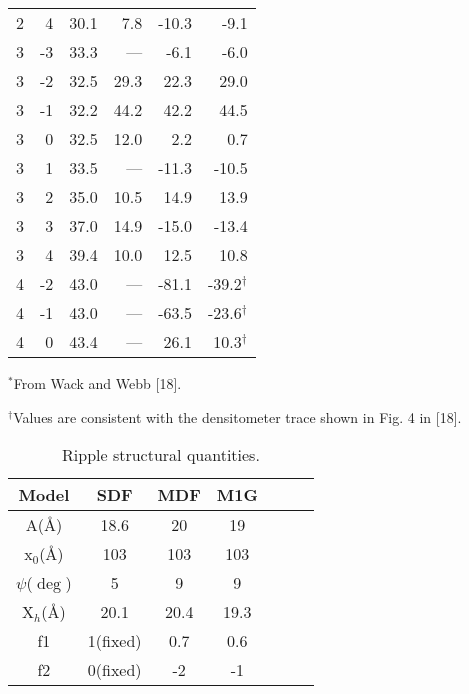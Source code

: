 \begin{table}
{\begin{tabular}{rrrrrr}
2 &   4 & 30.1  &  7.8  &  -10.3  &  -9.1 \\
3 &  -3 & 33.3  &  ---  &  -6.1  &  -6.0 \\
3 &  -2 & 32.5  &  29.3  &  22.3  &  29.0 \\
3 &  -1 & 32.2  &  44.2  &  42.2  &  44.5 \\
3 &   0 & 32.5  &  12.0    &  2.2  &  0.7   \\
3 &   1 & 33.5  &  ---  &  -11.3  &  -10.5 \\
3 &   2 & 35.0  &  10.5  &  14.9  &  13.9 \\
3 &   3 & 37.0  &  14.9  &  -15.0  &  -13.4 \\
3 &   4 & 39.4  &  10.0  &  12.5  &  10.8 \\
4 &  -2 & 43.0  &  ---  &  -81.1  &  -39.2$^{\dag}$ \\
4 &  -1 & 43.0  &  ---  &  -63.5  &  -23.6$^{\dag}$ \\
4 &   0 & 43.4  &  ---  &  26.1  &  10.3$^{\dag}$ \\
\end{tabular}
}
{\small
\indent $^{*}$From Wack and Webb [18].

\indent $^{\dag}$Values are consistent with the densitometer trace shown in 
        Fig. 4 in [18].
}
\end{table}

\pagebreak

\begin{table}
\caption{Ripple structural quantities.
\label{parameter}}
\vspace{6pt}
\begin{tabular}{ccccccc} 
Model & SDF & MDF & M1G \\ \hline
A(\AA) & 18.6 & 20  & 19 \\
x$_0$(\AA) & 103 & 103 & 103 \\
$\psi$($\deg$) & 5 & 9 & 9 \\
X$_h$(\AA) & 20.1 & 20.4 & 19.3 \\
f1 & 1(fixed) & 0.7 & 0.6 \\
f2 & 0(fixed) & -2 & -1 \\
\end{tabular}
\end{table}



